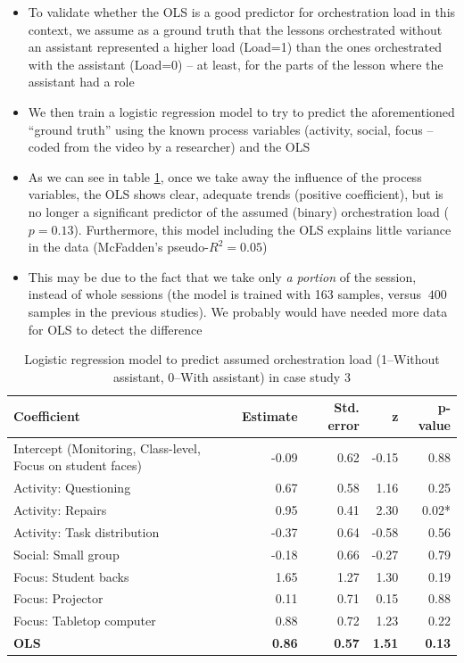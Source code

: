 \documentclass[10pt,journal,compsoc]{IEEEtran}
\begin{document}
\begin{itemize}
\item To validate whether the OLS is a good predictor for orchestration load in this context, we assume as a ground truth that the lessons orchestrated without an assistant represented a higher load (Load=1) than the ones orchestrated with the assistant (Load=0) -- at least, for the parts of the lesson where the assistant had a role 
\item We then train a logistic regression model to try to predict the aforementioned ``ground truth'' using the known process variables (activity, social, focus -- coded from the video by a researcher) and the OLS
\item As we can see in table \ref{tab:case3results}, once we take away the influence of the process variables, the OLS shows clear, adequate trends (positive coefficient), but is no longer a significant predictor of the assumed (binary) orchestration load ($p=0.13$). Furthermore, this model including the OLS explains little variance in the data (McFadden's pseudo-$R^2=0.05$) 
\item This may be due to the fact that we take only \textit{a portion} of the session, instead of whole sessions (the model is trained with 163 samples, versus $~400$ samples in the previous studies). We probably would have needed more data for OLS to detect the difference
\end{itemize}

\begin{table}[!t]
\caption{Logistic regression model to predict assumed orchestration load (1--Without assistant, 0--With assistant) in case study 3}
\label{tab:case3results}
\centering
\begin{tabular}{|p{2.8cm}||r|r|r|r|}
\hline
Coefficient & Estimate & Std. error & z & p-value\\
\hline
\hline
Intercept (Monitoring, Class-level, Focus on student faces) & -0.09 & 0.62 & -0.15 & 0.88 \\
Activity: Questioning & 0.67 & 0.58 & 1.16 & 0.25 \\
Activity: Repairs & 0.95 & 0.41 & 2.30 & 0.02* \\
Activity: Task distribution & -0.37 & 0.64 & -0.58 & 0.56 \\
Social: Small group & -0.18 & 0.66 & -0.27 & 0.79 \\
Focus: Student backs & 1.65 & 1.27 & 1.30 & 0.19 \\
Focus: Projector & 0.11 & 0.71 & 0.15 & 0.88 \\
Focus: Tabletop computer & 0.88 & 0.72 & 1.23 & 0.22 \\
\textbf{OLS} & \textbf{0.86} & \textbf{0.57} & \textbf{1.51} & \textbf{0.13} \\
\hline
\end{tabular}
\end{table}
\end{document}
